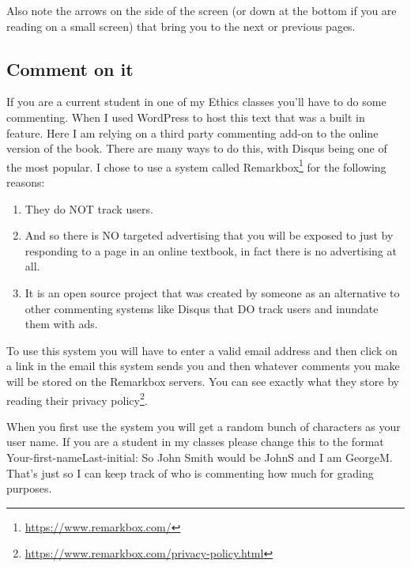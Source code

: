 \documentclass[12pt, openany]{book}
\providecommand{\tightlist}{%
  \setlength{\itemsep}{0pt}\setlength{\parskip}{0pt}}
\renewcommand{\href}[2]{#2\footnote{\url{#1}}}
\begin{document}
Also note the arrows on the side of the screen (or down at the bottom if you are reading on a small screen) that bring you to the next or previous pages.

\hypertarget{comment-on-it}{%
\subsection*{Comment on it}\label{comment-on-it}}


If you are a current student in one of my Ethics classes you'll have to do some commenting. When I used WordPress to host this text that was a built in feature. Here I am relying on a third party commenting add-on to the online version of the book. There are many ways to do this, with Disqus being one of the most popular. I chose to use a system called \href{https://www.remarkbox.com/}{Remarkbox} for the following reasons:

\begin{enumerate}
\def\labelenumi{\arabic{enumi}.}
\tightlist
\item
  They do NOT track users.
\item
  And so there is NO targeted advertising that you will be exposed to just by responding to a page in an online textbook, in fact there is no advertising at all.
\item
  It is an open source project that was created by someone as an alternative to other commenting systems like Disqus that DO track users and inundate them with ads.
\end{enumerate}

To use this system you will have to enter a valid email address and then click on a link in the email this system sends you and then whatever comments you make will be stored on the Remarkbox servers. You can see exactly what they store by reading their \href{https://www.remarkbox.com/privacy-policy.html}{privacy policy}.

When you first use the system you will get a random bunch of characters as your user name. If you are a student in my classes please change this to the format Your-first-nameLast-initial: So John Smith would be JohnS and I am GeorgeM. That's just so I can keep track of who is commenting how much for grading purposes.
\end{document}

